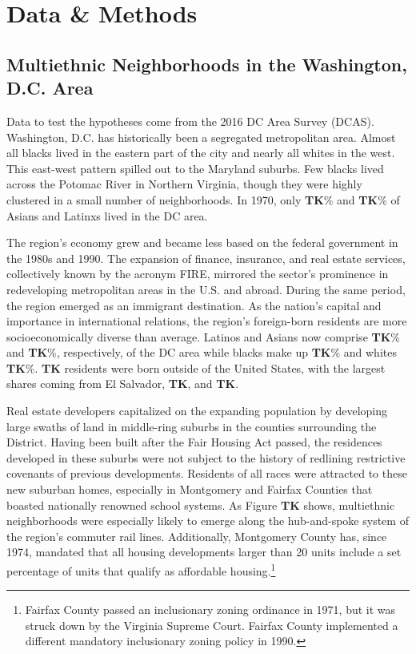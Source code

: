 \documentclass{baderart}
\begin{document}
\section{Data \& Methods}\label{data}
\subsection{Multiethnic Neighborhoods in the Washington, D.C. Area}\label{multiethnic-neighborhoods-in-the-washington-d.c.-area}

Data to test the hypotheses come from the 2016 DC Area Survey (DCAS). Washington, D.C. has historically been a segregated metropolitan area. Almost all blacks lived in the eastern part of the city and nearly all whites in the west. This east-west pattern spilled out to the Maryland suburbs. Few blacks lived across the Potomac River in Northern Virginia, though they were highly clustered in a small number of neighborhoods. In 1970, only \textbf{TK}\% and \textbf{TK}\% of Asians and Latinxs lived in the DC area.

The region's economy grew and became less based on the federal government in the 1980s and 1990. The expansion of finance, insurance, and real estate services, collectively known by the acronym FIRE, mirrored the sector's prominence in redeveloping metropolitan areas in the U.S. and abroad. During the same period, the region emerged as an immigrant destination. As the nation's capital and importance in international relations, the region's foreign-born residents are more socioeconomically diverse than average. Latinos and Asians now comprise \textbf{TK}\% and \textbf{TK}\%, respectively, of the DC area while blacks make up \textbf{TK}\% and whites \textbf{TK}\%. \textbf{TK} residents were born outside of the United States, with the largest shares coming from El Salvador, \textbf{TK}, and \textbf{TK}.

Real estate developers capitalized on the expanding population by developing large swaths of land in middle-ring suburbs in the counties surrounding the District. Having been built after the Fair Housing Act passed, the residences developed in these suburbs were not subject to the history of redlining restrictive covenants of previous developments. Residents of all races were attracted to these new suburban homes, especially in Montgomery and Fairfax Counties that boasted nationally renowned school systems. As Figure \textbf{TK} shows, multiethnic neighborhoods were especially likely to emerge along the hub-and-spoke system of the region's commuter rail lines. Additionally, Montgomery County has, since 1974, mandated that all housing developments larger than 20 units include a set percentage of units that qualify as affordable housing.\footnote{Fairfax County passed an inclusionary   zoning ordinance in 1971, but it was struck down by the Virginia   Supreme Court. Fairfax County implemented a different mandatory   inclusionary zoning policy in 1990.}
\end{document}
